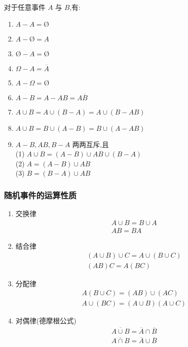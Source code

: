 \begin{property}
    \indent 对于任意事件 $A$ 与 $B$,有:
    \begin{enumerate}
        \item $A - A = \text{\O}$
        \item $A - \text{\O} = A$
        \item $\text{\O} - A = \text{\O}$
        \item $\varOmega - A = \overline{A}$
        \item $A - \varOmega = \text{\O}$
        \item $A - B = A - AB = A \overline{B}$
        \item $A \cup B = A \cup (B-A) = A \cup (B-AB)$
        \item $A \cup B = B \cup (A-B) = B \cup (A-AB)$
        \item $A-B, AB, B-A$ 两两互斥,且 \\
        (1) $A \cup B = (A-B) \cup AB \cup (B-A)$ \\
        (2) $A = (A-B) \cup AB$ \\
        (3) $B = (B-A) \cup AB$
    \end{enumerate}
\end{property}

\subsubsection{随机事件的运算性质}

\begin{property}
    \begin{enumerate}
        \item 交换律
        $$
        \begin{gathered}
            A \cup B = B \cup A \\
            AB=BA
        \end{gathered}
        $$
        \item 结合律
        $$
        \begin{gathered}
            (A \cup B) \cup C = A \cup (B \cup C) \\
            (AB)C=A(BC)
        \end{gathered}
        $$
        \item 分配律
        $$
        \begin{gathered}
            A(B \cup C) = (AB) \cup (AC) \\
            A \cup (BC) = (A \cup B)(A \cup C)
        \end{gathered}
        $$
        \item 对偶律(德摩根公式)
        $$
        \begin{gathered}
            \overline{A \cup B} = \overline{A} \cap \overline{B} \\
            \overline{A \cap B} = \overline{A} \cup \overline{B}
        \end{gathered}
        $$
    \end{enumerate}
\end{property}

